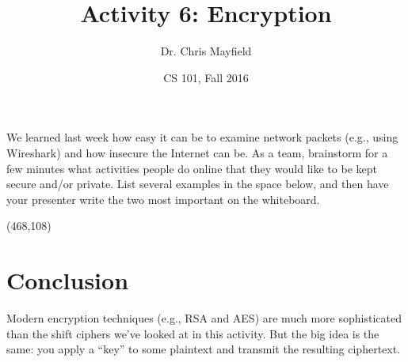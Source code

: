\documentclass[11pt]{article}
\title{Activity 6: Encryption}
\author{Dr. Chris Mayfield}
\date{CS 101, Fall 2016}
\begin{document}
\maketitle


We learned last week how easy it can be to examine network packets (e.g., using Wireshark) and how insecure the Internet can be.
As a team, brainstorm for a few minutes what activities people do online that they would like to be kept secure and/or private.
List several examples in the space below, and then have your presenter write the two most important on the whiteboard.

\vspace{1em}
\framebox(468,108)





\newpage



\section*{Conclusion}

Modern encryption techniques (e.g., RSA and AES) are much more sophisticated than the shift ciphers we've looked at in this activity.
But the big idea is the same: you apply a ``key'' to some plaintext and transmit the resulting ciphertext.
\end{document}
